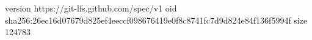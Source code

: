 version https://git-lfs.github.com/spec/v1
oid sha256:26ec16d07679d825ef4eeccf098676419e0f8c8741fc7d9d824e84f136f5994f
size 124783
